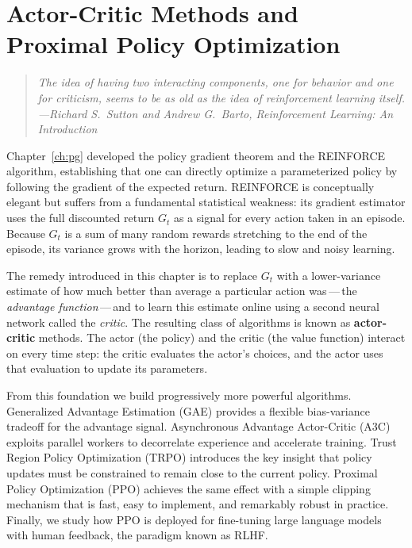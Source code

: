 \chapter[Actor-Critic Methods and PPO]{Actor-Critic Methods and Proximal Policy Optimization}
\label{ch:actor-critic}

\begin{quote}
\itshape
The idea of having two interacting components, one for behavior and one for
criticism, seems to be as old as the idea of reinforcement learning itself.
\upshape\hfill---Richard S.\ Sutton and Andrew G.\ Barto, \textit{Reinforcement Learning: An Introduction}
\end{quote}

\bigskip

Chapter~\ref{ch:pg} developed the policy gradient theorem and the REINFORCE
algorithm, establishing that one can directly optimize a parameterized policy
by following the gradient of the expected return.  REINFORCE is
conceptually elegant but suffers from a fundamental statistical weakness: its
gradient estimator uses the full discounted return $G_t$ as a signal for
every action taken in an episode.  Because $G_t$ is a sum of many random
rewards stretching to the end of the episode, its variance grows with the
horizon, leading to slow and noisy learning.

The remedy introduced in this chapter is to replace $G_t$ with a lower-variance
estimate of how much better than average a particular action was\,---\,the
\emph{advantage function}\,---\,and to learn this estimate online using a
second neural network called the \emph{critic}.  The resulting class of
algorithms is known as \textbf{actor-critic} methods.
The actor (the policy) and the critic (the value function) interact on every
time step: the critic evaluates the actor's choices, and the actor uses that
evaluation to update its parameters.

From this foundation we build progressively more powerful algorithms.
Generalized Advantage Estimation (GAE) provides a flexible bias-variance
tradeoff for the advantage signal.  Asynchronous Advantage Actor-Critic (A3C)
exploits parallel workers to decorrelate experience and accelerate training.
Trust Region Policy Optimization (TRPO) introduces the key insight that policy
updates must be constrained to remain close to the current policy.  Proximal
Policy Optimization (PPO) achieves the same effect with a simple clipping
mechanism that is fast, easy to implement, and remarkably robust in practice.
Finally, we study how PPO is deployed for fine-tuning large language models
with human feedback, the paradigm known as RLHF.

